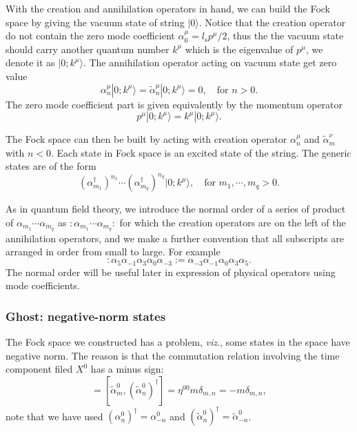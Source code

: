 \documentclass[graybox,envcountchap,sectrefs]{svmono}
\begin{document}
With the creation and annihilation operators in hand, we can build the Fock space by giving the vacuum state of string $|0\rangle$. Notice that the creation operator do not contain the zero mode coefficient $\alpha_{0}^{\mu}=l_{\mathrm{s}}p^{\mu}/2$, thus the the vacuum state should carry another quantum number $k^{\mu}$ which is the eigenvalue of $p^{\mu}$, we denote it as $|0;k^{\mu}\rangle$. The annihilation operator acting on vacuum state get zero value
\begin{equation}
\alpha_{n}^{\mu}|0;k^{\mu}\rangle=	\tilde{\alpha}_{n}^{\mu}|0;k^{\mu}\rangle=0,\quad \text{for}\,\,n>0.
\end{equation}
The zero mode coefficient part is given equivalently by the momentum operator
\begin{equation}
p^{\mu}	|0;k^{\mu}\rangle=k^{\mu}|0;k^{\mu}\rangle.
\end{equation}

The Fock space can then be built by acting with creation operator $\alpha_n^{\mu}$ and $\tilde{\alpha}_m^{\nu}$ with $n<0$. Each state in Fock space is an excited state of the string. The generic states are of the form
\begin{equation}
(\alpha_{m_1}^{\dagger})^{n_1}\cdots	(\alpha_{m_q}^{\dagger})^{n_q}|0;k^{\mu}\rangle,\quad \text{for}\,\, m_1,\cdots , m_q>0.
\end{equation}

As in quantum field theory, we introduce the normal order of a series of product of $\alpha_{m_1}\cdots \alpha_{m_q}$ as $:\alpha_{m_1}\cdots \alpha_{m_q}:$ for which the creation operators are on the left of the annihilation operators, and we make a further convention that all subscripts are arranged in order from small to large. For example
\begin{equation}
:\alpha_5\alpha_{-1}\alpha_{3}\alpha_0\alpha_{-3}:=\alpha_{-3}	\alpha_{-1}\alpha_0\alpha_{3}\alpha_5.
\end{equation}
The normal order will be useful later in expression of physical operators using mode coefficients.



\subsubsection*{Ghost: negative-norm states}

The Fock space we constructed has a problem, \emph{viz}., some states in the space have negative norm. The reason is that the commutation relation involving the time component filed $X^{0}$ has a minus sign:
\begin{equation}
[\alpha^{0}_m,(\alpha^{0}_n)^{\dagger}]=[\tilde{\alpha}^{0}_m,(\tilde{\alpha}^{0}_n)^{\dagger}]=\eta^{00}m\delta_{m,n}=-m\delta_{m,n},
\end{equation}
note that we have used $(\alpha_n^0)^{\dagger}=\alpha^0_{-n}$ and $(\tilde{\alpha}_n^0)^{\dagger}=\tilde{\alpha}^0_{-n}$.
\end{document}
